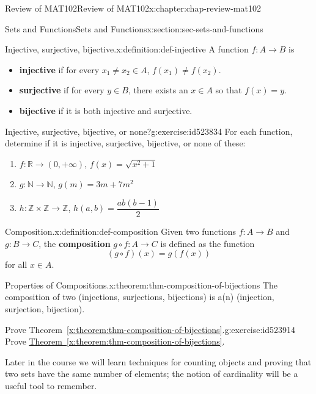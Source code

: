 \documentclass[oneside,10pt,]{book}
\newcommand{\xreffont}{\relax}
\newcommand{\terminology}[1]{\textbf{#1}}
\numberwithin{equation}{section}
\begin{document}
\begin{chapterptx}{Review of MAT102}{}{Review of MAT102}{}{}{x:chapter:chap-review-mat102}
\begin{sectionptx}{Sets and Functions}{}{Sets and Functions}{}{}{x:section:sec-sets-and-functions}
\begin{definition}{Injective, surjective, bijective.}{x:definition:def-injective}
A function \(f: A \rightarrow B\) is%
\begin{itemize}[label=\textbullet]
\item{}\terminology{injective} if for every \(x_1 \ne x_2 \in A\), \(f(x_1) \ne f(x_2)\).%
\item{}\terminology{surjective} if for every \(y \in B\), there exists an \(x \in A\) so that \(f(x) = y\).%
\item{}\terminology{bijective} if it is both injective and surjective.%
\end{itemize}
%
\end{definition}
\begin{inlineexercise}{Injective, surjective, bijective, or none?}{g:exercise:id523834}%
For each function, determine if it is injective, surjective, bijective, or none of these:%
%
\begin{enumerate}[label=(\alph*)]
\item{}\(f: \mathbb{R} \rightarrow (0,+\infty)\), \(f(x) = \sqrt{x^2+1}\)%
\item{}\(g: \mathbb{N} \rightarrow \mathbb{N}\), \(g(m) = 3m + 7m^2\)%
\item{}\(h: \mathbb{Z} \times \mathbb{Z} \rightarrow \mathbb{Z}\), \(h(a,b) = \dfrac{ab(b-1)}{2}\)%
\end{enumerate}
\end{inlineexercise}%
\begin{definition}{Composition.}{x:definition:def-composition}%
\label{g:notation:id523893} Given two functions \(f: A \rightarrow B\) and \(g: B \rightarrow C\), the \terminology{composition} \(g \circ f: A \rightarrow C\) is defined as the function%
\begin{equation*}
(g \circ f)(x) = g(f(x))
\end{equation*}
for all \(x \in A\).%
\end{definition}
\begin{theorem}{Properties of Compositions.}{}{x:theorem:thm-composition-of-bijections}%
The composition of two (injections, surjections, bijections) is a(n) (injection, surjection, bijection).%
\end{theorem}
\begin{inlineexercise}{Prove Theorem~{\xreffont\ref*{x:theorem:thm-composition-of-bijections}}.}{g:exercise:id523914}%
Prove \hyperref[x:theorem:thm-composition-of-bijections]{Theorem~{\xreffont\ref{x:theorem:thm-composition-of-bijections}}}.%
\end{inlineexercise}%
Later in the course we will learn techniques for counting objects and proving that two sets have the same number of elements; the notion of cardinality will be a useful tool to remember.%

\end{sectionptx}
\end{chapterptx}
\end{document}
